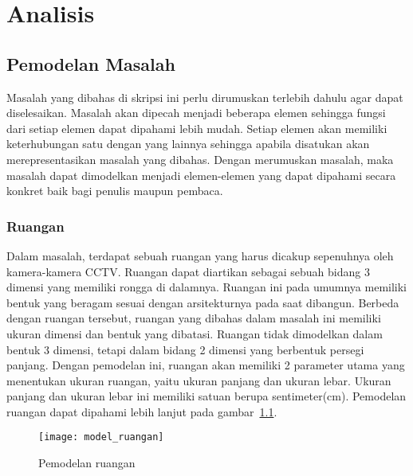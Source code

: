 \chapter{Analisis}

\section{Pemodelan Masalah}
Masalah yang dibahas di skripsi ini perlu dirumuskan terlebih dahulu agar dapat diselesaikan. Masalah akan dipecah menjadi beberapa elemen sehingga fungsi dari setiap elemen dapat dipahami lebih mudah. Setiap elemen akan memiliki keterhubungan satu dengan yang lainnya sehingga apabila disatukan akan merepresentasikan masalah yang dibahas. Dengan merumuskan masalah, maka masalah dapat dimodelkan menjadi elemen-elemen yang dapat dipahami secara konkret baik bagi penulis maupun pembaca.


\subsection{Ruangan}
Dalam masalah, terdapat sebuah ruangan yang harus dicakup sepenuhnya oleh kamera-kamera CCTV. Ruangan dapat diartikan sebagai sebuah bidang 3 dimensi yang memiliki rongga di dalamnya. Ruangan ini pada umumnya memiliki bentuk yang beragam sesuai dengan arsitekturnya pada saat dibangun. Berbeda dengan ruangan tersebut, ruangan yang dibahas dalam masalah ini memiliki ukuran dimensi dan bentuk yang dibatasi. Ruangan tidak dimodelkan dalam bentuk 3 dimensi, tetapi dalam bidang 2 dimensi yang berbentuk persegi panjang. Dengan pemodelan ini, ruangan akan memiliki 2 parameter utama yang menentukan ukuran ruangan, yaitu ukuran panjang dan ukuran lebar. Ukuran panjang dan ukuran lebar ini memiliki satuan berupa sentimeter(cm). Pemodelan ruangan dapat dipahami lebih lanjut pada gambar~\ref{fig:model_ruangan}.

\begin{figure}[H]
	\centering  
	\texttt{[image: model\_ruangan]}
	\caption[Pemodelan ruangan]{Pemodelan ruangan} 
	\label{fig:model_ruangan}
\end{figure}


